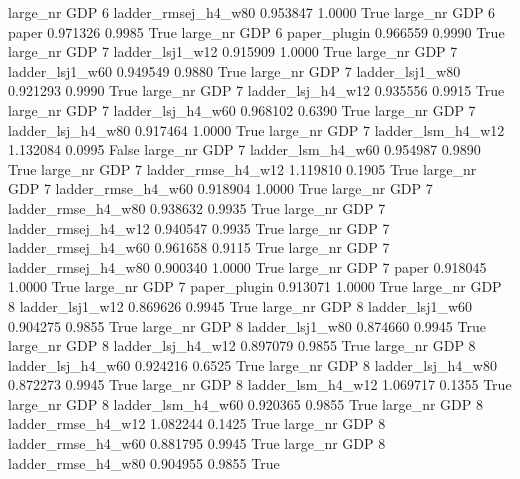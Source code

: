   large_nr      GDP                 6 ladder_rmsej_h4_w80   0.953847      1.0000    True
  large_nr      GDP                 6               paper   0.971326      0.9985    True
  large_nr      GDP                 6        paper_plugin   0.966559      0.9990    True
  large_nr      GDP                 7     ladder_lsj1_w12   0.915909      1.0000    True
  large_nr      GDP                 7     ladder_lsj1_w60   0.949549      0.9880    True
  large_nr      GDP                 7     ladder_lsj1_w80   0.921293      0.9990    True
  large_nr      GDP                 7   ladder_lsj_h4_w12   0.935556      0.9915    True
  large_nr      GDP                 7   ladder_lsj_h4_w60   0.968102      0.6390    True
  large_nr      GDP                 7   ladder_lsj_h4_w80   0.917464      1.0000    True
  large_nr      GDP                 7   ladder_lsm_h4_w12   1.132084      0.0995   False
  large_nr      GDP                 7   ladder_lsm_h4_w60   0.954987      0.9890    True
  large_nr      GDP                 7  ladder_rmse_h4_w12   1.119810      0.1905    True
  large_nr      GDP                 7  ladder_rmse_h4_w60   0.918904      1.0000    True
  large_nr      GDP                 7  ladder_rmse_h4_w80   0.938632      0.9935    True
  large_nr      GDP                 7 ladder_rmsej_h4_w12   0.940547      0.9935    True
  large_nr      GDP                 7 ladder_rmsej_h4_w60   0.961658      0.9115    True
  large_nr      GDP                 7 ladder_rmsej_h4_w80   0.900340      1.0000    True
  large_nr      GDP                 7               paper   0.918045      1.0000    True
  large_nr      GDP                 7        paper_plugin   0.913071      1.0000    True
  large_nr      GDP                 8     ladder_lsj1_w12   0.869626      0.9945    True
  large_nr      GDP                 8     ladder_lsj1_w60   0.904275      0.9855    True
  large_nr      GDP                 8     ladder_lsj1_w80   0.874660      0.9945    True
  large_nr      GDP                 8   ladder_lsj_h4_w12   0.897079      0.9855    True
  large_nr      GDP                 8   ladder_lsj_h4_w60   0.924216      0.6525    True
  large_nr      GDP                 8   ladder_lsj_h4_w80   0.872273      0.9945    True
  large_nr      GDP                 8   ladder_lsm_h4_w12   1.069717      0.1355    True
  large_nr      GDP                 8   ladder_lsm_h4_w60   0.920365      0.9855    True
  large_nr      GDP                 8  ladder_rmse_h4_w12   1.082244      0.1425    True
  large_nr      GDP                 8  ladder_rmse_h4_w60   0.881795      0.9945    True
  large_nr      GDP                 8  ladder_rmse_h4_w80   0.904955      0.9855    True

